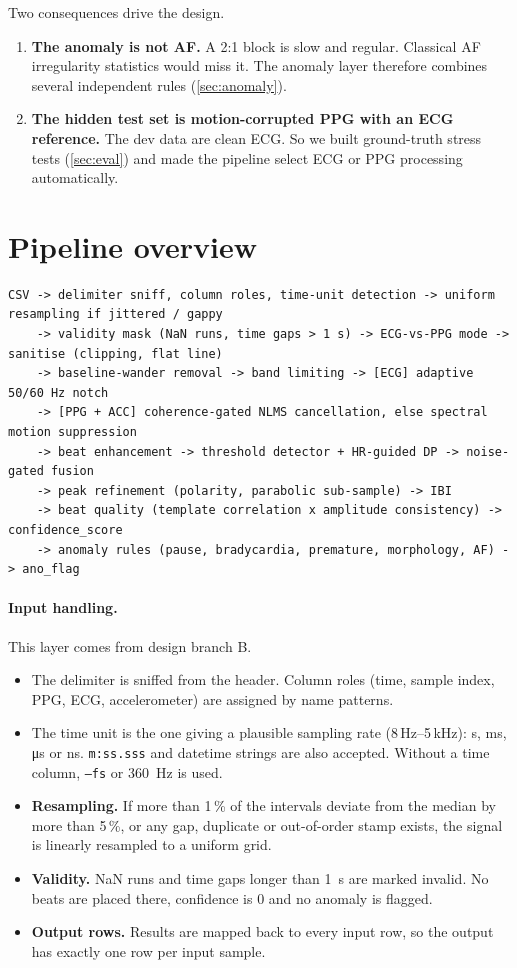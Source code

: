 \documentclass[10pt,a4paper]{article}
\newcommand{\code}[1]{\texttt{#1}}
\begin{document}
Two consequences drive the design.
\begin{enumerate}
  \item \textbf{The anomaly is not AF.} A 2:1 block is slow and regular. Classical AF irregularity statistics would miss it.
        The anomaly layer therefore combines several independent rules (\cref{sec:anomaly}).
  \item \textbf{The hidden test set is motion-corrupted PPG with an ECG reference.} The dev data are clean ECG.
        So we built ground-truth stress tests (\cref{sec:eval}) and made the pipeline select ECG or PPG processing
        automatically.
\end{enumerate}

\section{Pipeline overview}

\begin{lstlisting}
CSV -> delimiter sniff, column roles, time-unit detection -> uniform resampling if jittered / gappy
    -> validity mask (NaN runs, time gaps > 1 s) -> ECG-vs-PPG mode -> sanitise (clipping, flat line)
    -> baseline-wander removal -> band limiting -> [ECG] adaptive 50/60 Hz notch
    -> [PPG + ACC] coherence-gated NLMS cancellation, else spectral motion suppression
    -> beat enhancement -> threshold detector + HR-guided DP -> noise-gated fusion
    -> peak refinement (polarity, parabolic sub-sample) -> IBI
    -> beat quality (template correlation x amplitude consistency) -> confidence_score
    -> anomaly rules (pause, bradycardia, premature, morphology, AF) -> ano_flag
\end{lstlisting}

\paragraph{Input handling.}
This layer comes from design branch B.
\begin{itemize}
  \item The delimiter is sniffed from the header. Column roles (time, sample index, PPG, ECG, accelerometer) are
        assigned by name patterns.
  \item The time unit is the one giving a plausible sampling rate (8\,Hz--5\,kHz): s, ms, \si{\micro s} or ns.
        \code{m:ss.sss} and datetime strings are also accepted. Without a time column, \code{--fs} or \SI{360}{Hz} is used.
  \item \textbf{Resampling.} If more than 1\,\% of the intervals deviate from the median by more than 5\,\%, or any
        gap, duplicate or out-of-order stamp exists, the signal is linearly resampled to a uniform grid.
  \item \textbf{Validity.} NaN runs and time gaps longer than \SI{1}{s} are marked invalid. No beats are placed there,
        confidence is 0 and no anomaly is flagged.
  \item \textbf{Output rows.} Results are mapped back to every input row, so the output has exactly one row per input
        sample.
\end{itemize}
\end{document}
